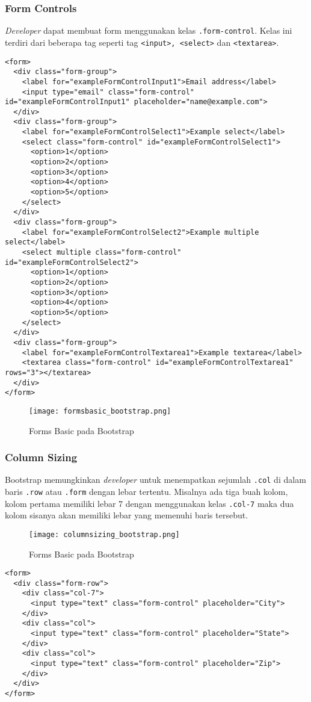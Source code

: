 \subsubsection{Form Controls}
\textit{Developer} dapat membuat form menggunakan kelas \texttt{.form-control}. Kelas ini terdiri dari beberapa tag seperti tag \texttt{<input>, <select>} dan \texttt{<textarea>}.
\begin{lstlisting}[frame=single, basicstyle=\tiny] 
<form>
  <div class="form-group">
    <label for="exampleFormControlInput1">Email address</label>
    <input type="email" class="form-control" id="exampleFormControlInput1" placeholder="name@example.com">
  </div>
  <div class="form-group">
    <label for="exampleFormControlSelect1">Example select</label>
    <select class="form-control" id="exampleFormControlSelect1">
      <option>1</option>
      <option>2</option>
      <option>3</option>
      <option>4</option>
      <option>5</option>
    </select>
  </div>
  <div class="form-group">
    <label for="exampleFormControlSelect2">Example multiple select</label>
    <select multiple class="form-control" id="exampleFormControlSelect2">
      <option>1</option>
      <option>2</option>
      <option>3</option>
      <option>4</option>
      <option>5</option>
    </select>
  </div>
  <div class="form-group">
    <label for="exampleFormControlTextarea1">Example textarea</label>
    <textarea class="form-control" id="exampleFormControlTextarea1" rows="3"></textarea>
  </div>
</form>
\end{lstlisting}

\begin{figure} [H]
	\centering  
	\texttt{[image: formsbasic\_bootstrap.png]}  
	\caption{Forms Basic pada Bootstrap} 
\end{figure} 
\subsubsection{Column Sizing}
Bootstrap memungkinkan \textit{developer} untuk menempatkan sejumlah \texttt{.col} di dalam baris \texttt{.row} atau \texttt{.form} dengan lebar tertentu. Misalnya ada tiga buah kolom, kolom pertama memiliki lebar 7 dengan menggunakan kelas \texttt{.col-7} maka dua kolom sisanya akan memiliki lebar yang  memenuhi baris tersebut.
\begin{figure} [H]
	\centering  
	\texttt{[image: columnsizing\_bootstrap.png]}  
	\caption{Forms Basic pada Bootstrap} 
\end{figure} 
\begin{lstlisting}[frame=single] 
<form>
  <div class="form-row">
    <div class="col-7">
      <input type="text" class="form-control" placeholder="City">
    </div>
    <div class="col">
      <input type="text" class="form-control" placeholder="State">
    </div>
    <div class="col">
      <input type="text" class="form-control" placeholder="Zip">
    </div>
  </div>
</form>
\end{lstlisting}
